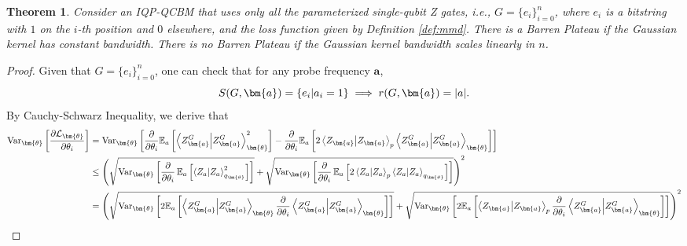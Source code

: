 \documentclass[a4paper,onecolumn,notitlepage,nofootinbib,longbibliography,superscriptaddress, floatfix, pra, aps, 10pt]{revtex4-2}
\newcommand{\vttheta}{{\bm{\theta}}}
\newcommand{\vta}{{\bm{a}}}
\newtheorem{theorem}{Theorem}
\begin{document}
\begin{theorem}
Consider an IQP-QCBM that uses only all the parameterized single-qubit Z gates, i.e., $G=\{e_i\}_{i=0}^n$, where $e_i$ is a bitstring with $1$ on the $i$-th position and $0$ elsewhere, and the loss function given by Definition \ref{def:mmd}. There is a Barren Plateau if the Gaussian kernel has constant bandwidth. There is no Barren Plateau if the Gaussian kernel bandwidth scales linearly in $n$.
\end{theorem}
\begin{proof}
Given that $G=\{e_i\}_{i=0}^n$, one can check that for any probe frequency $\vta$, \begin{equation}S(G,\vta) = \{e_i|a_i=1\} \implies r(G,\vta)=\abs{a}.\end{equation} 
By Cauchy-Schwarz Inequality, we derive that
\begin{align}
\operatorname{Var}_\vttheta \left[\frac{\partial \mathcal{L}_\vttheta}{\partial \theta_i}\right] &= \operatorname{Var}_\vttheta \left[ \frac{\partial}{\partial \theta_i}\mathbb{E}_a\left[\braket{Z^G_\vta}_\vttheta^2 \right] - \frac{\partial}{\partial \theta_i} \mathbb{E}_a\left[2\braket{Z_\vta}_p \braket{Z^G_\vta}_\vttheta \right] \right] \\
&\leq \left(\sqrt{\operatorname{Var}_\vttheta \left[\frac{\partial}{\partial \theta_i} \operatorname{\mathbb{E}}_{a} \left[\braket{Z_{a}}_{q_\vttheta}^2\right] \right]} + \sqrt{\operatorname{Var}_\vttheta \left[ \frac{\partial}{\partial \theta_i}\operatorname{\mathbb{E}}_{a} \left[2\braket{Z_{a}}_p \braket{Z_{a}}_{q_\vttheta}\right]\right]} \right)^2 \\
& =  \left(\sqrt{\operatorname{Var}_\vttheta \left[2 \mathbb{E}_a \left[\braket{Z^G_\vta}_\vttheta \frac{\partial}{\partial \theta_i}\braket{Z^G_\vta}_\vttheta\right] \right]} + \sqrt{\operatorname{Var}_\vttheta \left[ 2 \mathbb{E}_a\left[\braket{Z_\vta}_p \frac{\partial}{\partial \theta_i} \braket{Z^G_\vta}_\vttheta \right]
 \right]} \right)^2
\end{align}


\end{proof}
\end{document}
